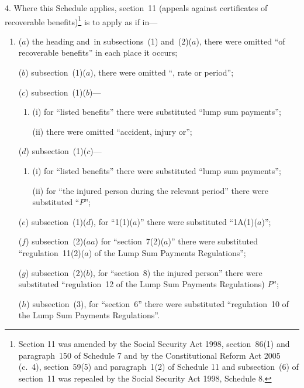 \documentclass[12pt,a4paper]{article}
\begin{document}
4.  Where this Schedule applies, section~11 (appeals against certificates of recoverable benefits)\footnote{Section 11 was amended by the Social Security Act 1998, section~86(1) and paragraph~150 of Schedule 7 and by the Constitutional Reform Act 2005 (c.~4), section~59(5) and paragraph~1(2) of Schedule 11 and subsection~(6) of section~11 was repealed by the Social Security Act 1998, Schedule 8.} is to apply as if in—
\begin{enumerate}\item[]
($a$) the heading and~in subsections~(1) and~(2)($a$), there were omitted “of recoverable benefits” in each place it occurs;

($b$) subsection~(1)($a$), there were omitted “, rate or period”;

($c$) subsection~(1)($b$)—
\begin{enumerate}\item[]
(i) for “listed benefits” there were substituted “lump sum payments”;

(ii) there were omitted “accident, injury or”;
\end{enumerate}

($d$) subsection~(1)($c$)—
\begin{enumerate}\item[]
(i) for “listed benefits” there were substituted “lump sum payments”;

(ii) for “the injured person during the relevant period” there were substituted “$P$”;
\end{enumerate}

($e$) subsection~(1)($d$), for “1(1)($a$)” there were substituted “1A(1)($a$)”;

($f$) subsection~(2)($aa$)  for “section~7(2)($a$)” there were substituted “regulation~11(2)($a$)  of the Lump Sum Payments Regulations”;

($g$) subsection~(2)($b$), for “section~8) the injured person” there were substituted “regulation~12 of the Lump Sum Payments Regulations) $P$”;

($h$) subsection~(3), for “section~6” there were substituted “regulation~10 of the Lump Sum Payments Regulations”.
\end{enumerate}

\medskip
\end{document}
